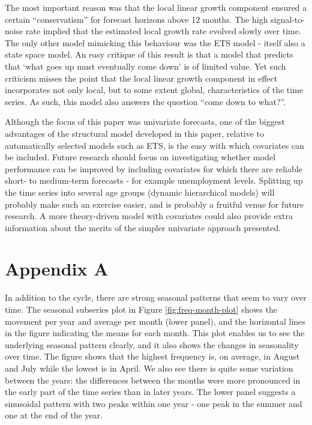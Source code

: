 \documentclass[]{article}
\begin{document}
The most important reason was that the local linear growth component
ensured a certain ``conservatism'' for forecast horizons above 12
months. The high signal-to-noise rate implied that the estimated local
growth rate evolved slowly over time. The only other model mimicking
this behaviour was the ETS model - itself also a state space model. An
easy critique of this result is that a model that predicts that `what
goes up must eventually come down' is of limited value. Yet such
criticism misses the point that the local linear growth component in
effect incorporates not only local, but to some extent global,
characteristics of the time series. As such, this model also answers the
question ``come down to what?''.

Although the focus of this paper was univariate forecasts, one of the
biggest advantages of the structural model developed in this paper,
relative to automatically selected models such as ETS, is the easy with
which covariates can be included. Future research should focus on
investigating whether model performance can be improved by including
covariates for which there are reliable short- to medium-term forecasts
- for example unemployment levels. Splitting up the time series into
several age groups (dynamic hierarchical models) will probably make such
an exercise easier, and is probably a fruitful venue for future
research. A more theory-driven model with covariates could also provide
extra information about the merits of the simpler univariate approach
presented.

\section{Appendix A}\label{appendix-a}

In addition to the cycle, there are strong seasonal patterns that seem
to vary over time. The seasonal subseries plot in Figure
\ref{fig:freq-month-plot} shows the movement per year and average per
month (lower panel), and the horizontal lines in the figure indicating
the means for each month. This plot enables us to see the underlying
seasonal pattern clearly, and it also shows the changes in seasonality
over time. The figure shows that the highest frequency is, on average,
in August and July while the lowest is in April. We also see there is
quite some variation between the years: the differences between the
months were more pronounced in the early part of the time series than in
later years. The lower panel suggests a sinusoidal pattern with two
peaks within one year - one peak in the summer and one at the end of the
year.
\end{document}
